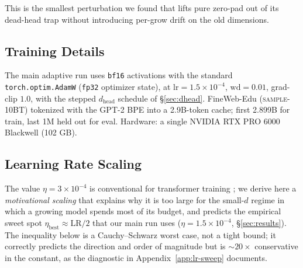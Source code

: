 \documentclass{article}
\begin{document}
This is the smallest perturbation we found that lifts pure zero-pad out of
its dead-head trap without introducing per-grow drift on the old dimensions.

\subsection{Training Details}
The main adaptive run uses \texttt{bf16} activations with the standard
\texttt{torch.optim.AdamW} (\texttt{fp32} optimizer state), at
$\mathrm{lr}=1.5{\times}10^{-4}$, $\mathrm{wd}=0.01$, grad-clip $1.0$,
with the stepped $d_{\text{head}}$ schedule of \S\ref{sec:dhead}.
FineWeb-Edu (\textsc{sample-10BT}) tokenized with the GPT-2 BPE into a
2.9B-token cache; first 2.899B for train, last 1M held out for eval.
Hardware: a single NVIDIA RTX PRO 6000 Blackwell (102 GB).

\subsection{Learning Rate Scaling}
\label{sec:lr-bound}

The value $\eta = 3{\times}10^{-4}$ is conventional for transformer
training \citep{adam}; we derive here a \emph{motivational scaling}
that explains why it is too large for the small-$d$ regime in which
a growing model spends most of its budget, and predicts the empirical
sweet spot $\eta_{\text{best}} \approx \mathrm{LR}/2$ that our main
run uses ($\eta = 1.5{\times}10^{-4}$, \S\ref{sec:results}).  The
inequality below is a Cauchy--Schwarz worst case, not a tight bound;
it correctly predicts the direction and order of magnitude but is
$\sim 20{\times}$ conservative in the constant, as the diagnostic in
Appendix~\ref{app:lr-sweep} documents.
\end{document}
